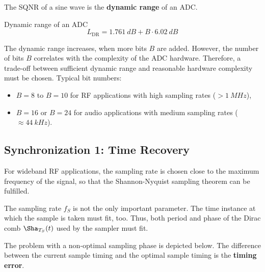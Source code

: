 \begin{refsection}
The \ac{SQNR} of a sine wave is the  \textbf{dynamic range} of an \ac{ADC}.
\begin{definition}{Dynamic range of an \ac{ADC}}
	\begin{equation}
		L_{\mathrm{DR}} = \SI{1.761}{dB} + B \cdot \SI{6.02}{dB}
	\end{equation}
\end{definition}

The dynamic range increases, when more bits $B$ are added. However, the number of bits $B$ correlates with the complexity of the \ac{ADC} hardware. Therefore, a trade-off between sufficient dynamic range and reasonable hardware complexity must be chosen. Typical bit numbers:
\begin{itemize}
	\item $B = 8$ to $B = 10$ for \ac{RF} applications with high sampling rates ($> \SI{1}{MHz}$),
	\item $B = 16$ or $B = 24$ for audio applications with medium sampling rates ($\approx \SI{44}{kHz}$).
\end{itemize}


%

\subsection{Synchronization 1: Time Recovery}

For wideband \ac{RF} applications, the sampling rate is chosen close to the maximum frequency of the signal, so that the Shannon-Nyquist sampling theorem can be fulfilled.

The sampling rate $f_S$ is not the only important parameter. The time instance at which the sample is taken must fit, too. Thus, both period and phase of the Dirac comb $\Sha_{T_S}(t)$ used by the sampler must fit.

The problem with a non-optimal sampling phase is depicted below. The difference between the current sample timing and the optimal sample timing is the  \textbf{timing error}.


\end{refsection}
